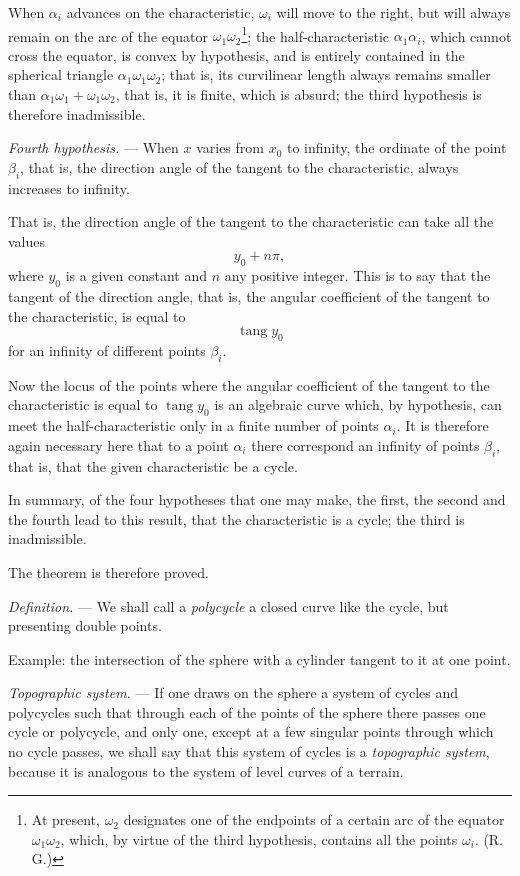 \documentclass[11pt]{article}
\begin{document}
When $\alpha_i$ advances on the characteristic, $\omega_i$ will move to the right, but will always remain on the arc of the equator $\omega_1\omega_2$\footnote{At present, $\omega_2$ designates one of the endpoints of a certain arc of the equator $\omega_1\omega_2$, which, by virtue of the third hypothesis, contains all the points $\omega_i$. (R. G.)}; the half-characteristic $\alpha_1\alpha_i$, which cannot cross the equator, is convex by hypothesis, and is entirely contained in the spherical triangle $\alpha_1\omega_1\omega_2$; that is, its curvilinear length always remains smaller than $\alpha_1\omega_1+\omega_1\omega_2$, that is, it is finite, which is absurd; the third hypothesis is therefore inadmissible.

\emph{Fourth hypothesis.} --- When $x$ varies from $x_0$ to infinity, the ordinate of the point $\beta_i$, that is, the direction angle of the tangent to the characteristic, always increases to infinity.

That is, the direction angle of the tangent to the characteristic can take all the values
\[
y_0+n\pi,
\]
where $y_0$ is a given constant and $n$ any positive integer. This is to say that the tangent of the direction angle, that is, the angular coefficient of the tangent to the characteristic, is equal to
\[
\operatorname{tang} y_0
\]
for an infinity of different points $\beta_i$.

Now the locus of the points where the angular coefficient of the tangent to the characteristic is equal to $\operatorname{tang} y_0$ is an algebraic curve which, by hypothesis, can meet the half-characteristic only in a finite number of points $\alpha_i$. It is therefore again necessary here that to a point $\alpha_i$ there correspond an infinity of points $\beta_i$, that is, that the given characteristic be a cycle.

In summary, of the four hypotheses that one may make, the first, the second and the fourth lead to this result, that the characteristic is a cycle; the third is inadmissible.

The theorem is therefore proved.

\emph{Definition.} --- We shall call a \emph{polycycle} a closed curve like the cycle, but presenting double points.

Example: the intersection of the sphere with a cylinder tangent to it at one point.

\emph{Topographic system.} --- If one draws on the sphere a system of cycles and polycycles such that through each of the points of the sphere there passes one cycle or polycycle, and only one, except at a few singular points through which no cycle passes, we shall say that this system of cycles is a \emph{topographic system}, because it is analogous to the system of level curves of a terrain.
\end{document}
